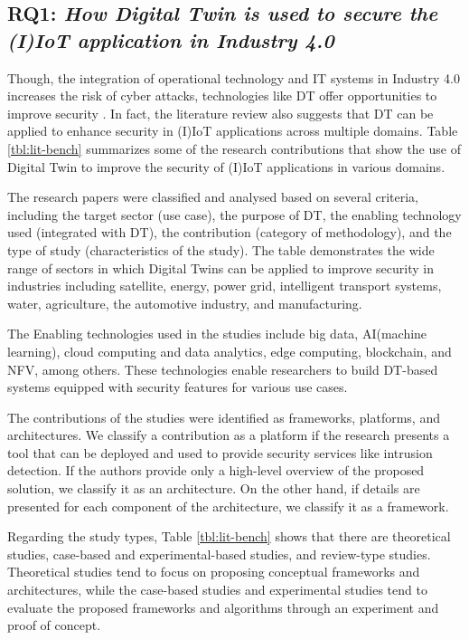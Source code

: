 %
%
\subsection*{RQ1: \textit{ How Digital Twin is used to secure the (I)IoT application in Industry 4.0}}

Though, the integration of operational technology and IT systems in Industry 4.0 increases the risk of cyber attacks, technologies like DT offer opportunities to improve security \cite{dietzHarnessingDigitalTwin2022}. In fact, the literature review also suggests that DT can be applied to enhance security in (I)IoT applications across multiple domains. Table \ref{tbl:lit-bench} summarizes some of the research contributions that show the use of Digital Twin to improve the security of (I)IoT applications in various domains. 

The research papers were classified and analysed based on several criteria, including the target sector (use case), the purpose of DT, the enabling technology used (integrated with DT), the contribution (category of methodology), and the type of study (characteristics of the study). The table demonstrates the wide range of sectors in which Digital Twins can be applied to improve security in industries including satellite, energy, power grid, intelligent transport systems, water, agriculture, the automotive industry, and manufacturing.

The Enabling technologies used in the studies include big data,  AI(machine learning), cloud computing and data analytics, edge computing, blockchain, and NFV, among others. These technologies enable researchers to build DT-based systems equipped with security features for various use cases.

The contributions of the studies were identified as frameworks, platforms, and architectures. We classify a contribution as a platform if the research presents a tool that can be deployed and used to provide security services like intrusion detection. If the authors provide only a high-level overview of the proposed solution, we classify it as an architecture. On the other hand, if details are presented for each component of the architecture, we classify it as a framework.

Regarding the study types, Table \ref{tbl:lit-bench} shows that there are theoretical studies, case-based and experimental-based studies, and review-type studies. Theoretical studies tend to focus on proposing conceptual frameworks and architectures, while the case-based studies and experimental studies tend to evaluate the proposed frameworks and algorithms through an experiment and proof of concept. 


